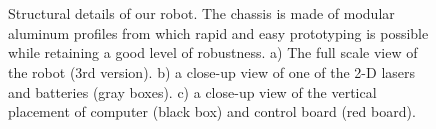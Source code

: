 \begin{figure}[ht]
    \centering
    \begin{subfigure}[b]{0.22\textwidth}
      	\centering
        \caption{}
        \label{fig:aluminum_structure}
    \end{subfigure}
    ~
    \begin{subfigure}[b]{0.22\textwidth}
      	\centering
        \caption{}
        \label{fig:batteries}
    \end{subfigure}
    ~
    \begin{subfigure}[b]{0.22\textwidth}
      	\centering
        \caption{}
        \label{fig:computer}
    \end{subfigure}
    \caption{Structural details of our robot. The chassis is made of modular aluminum profiles from which rapid and easy prototyping is possible while retaining a good level of robustness. a) The full scale view of the robot (3rd version). b) a close-up view of one of the 2-D lasers and batteries (gray boxes). c) a close-up view of the vertical placement of computer (black box) and control board (red board).}
    \label{fig:structure_details}
\end{figure}

